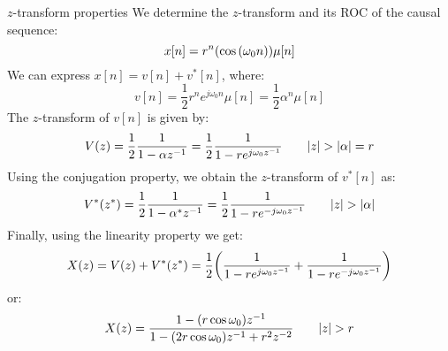 \documentclass[../../main/main.tex]{subfiles}
\begin{document}
\begin{example}{\boldmath\( z \)-transform properties}{}
    We determine the \( z \)-transform and its ROC of the causal sequence:
    \begin{equation}
        x[n]
        =
        r^{n}(\cos\qty(\omega_{0}n)) \mu[n]
        \label{eq:L14_S67_1}
    \end{equation}
    We can express \( x[n] = v[n] + v^{*}[n] \), where:
    \begin{equation}
        v[n]
        =
        \frac{1}{2} r^{n} e^{j\omega_{0}n} \mu[n] = \frac{1}{2} \alpha^{n} \mu[n]
        \label{eq:L14_S67_2}
    \end{equation}
    The \( z \)-transform of \( v[n] \) is given by:
    \begin{equation}
        V(z)
        =
        \frac{1}{2} \frac{1}{1 - \alpha z^{-1}}
        =
        \frac{1}{2} \frac{1}{1 - re^{j\omega_0 z^{-1}}}
        \qquad
        \abs{z} > \abs{\alpha} = r
        \label{eq:L14_S67_3}
    \end{equation}
    Using the conjugation property, we obtain the \( z \)-transform of \( v^{*}[n] \) as:
    \begin{equation}
        V^{*}(z^{*})
        =
        \frac{1}{2} \frac{1}{1 - \alpha^{*} z^{-1}}
        =
        \frac{1}{2} \frac{1}{1 - re^{-j\omega_{0}z^{-1}}}
        \qquad
        \abs{z} > \abs{\alpha}
        \label{eq:L14_S68_1}
    \end{equation}
    Finally, using the linearity property we get:
    \begin{equation}
        X(z)
        =
        V(z) + V^{*}(z^{*})
        =
        \frac{1}{2} \qty(\frac{1}{1 - re^{j\omega_0 z^{-1}}} + \frac{1}{1 - re^{-j\omega_0 z^{-1}}})
        \label{eq:L14_S68_2}
    \end{equation}
    or:
    \begin{equation}
        X(z)
        =
        \frac{1 - (r\cos\omega_{0})z^{-1}}{1 - (2r\cos\omega_{0})z^{-1} + r^{2}z^{-2}}
        \qquad
        \abs{z} > r
        \label{eq:L14_S68_3}
    \end{equation}
\end{example}
\end{document}
